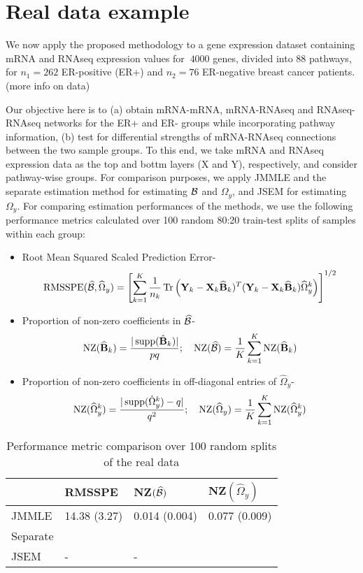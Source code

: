 \section{Real data example}
We now apply the proposed methodology to a gene expression dataset containing mRNA and RNAseq expression values for $~4000$ genes, divided into 88 pathways, for $n_1 = 262$ ER-positive (ER+) and $n_2 = 76$ ER-negative breast cancer patients. (more info on data)

Our objective here is to (a) obtain mRNA-mRNA, mRNA-RNAseq and RNAseq-RNAseq networks for the ER+ and ER- groups while incorporating pathway information, (b) test for differential strengths of mRNA-RNAseq connections between the two sample groups. To this end, we take mRNA and RNAseq expression data as the top and bottm layers (X and Y), respectively, and consider pathway-wise groups. For comparison purposes, we apply JMMLE and the separate estimation method \citet{LinEtal16} for estimating ${\cal{B}}$ and $\Omega_y$, and JSEM for estimating $\Omega_y$. For comparing estimation performances of the methods, we use the following performance metrics calculated over 100 random 80:20 train-test splits of samples within each group:
%
\begin{itemize}
\item Root Mean Squared Scaled Prediction Error-
%
$$ \text{RMSSPE}(\widehat {{\cal{B}}}, \widehat \Omega_y) = \left[
\sum_{k=1}^K \frac{1}{n_k} \operatorname*{Tr} \left({\mathbf{Y}}_k - {\mathbf{X}}_k \widehat {{\mathbf{B}}}_k)^T ({\mathbf{Y}}_k - {\mathbf{X}}_k \widehat {{\mathbf{B}}}_k)
\widehat\Omega_y^k \right)
\right]^{1/2} $$

\item Proportion of non-zero coefficients in $\widehat {{\cal{B}}}$-
%
$$ \text{NZ}(\widehat {{\mathbf{B}}}_k) = \frac{| \operatorname*{supp}(\hat {{\mathbf{B}}}_k) |}{pq}; \quad
\text{NZ}(\widehat {{\cal{B}}}) = \frac{1}{K} \sum_{k=1}^K \text{NZ}(\widehat {{\mathbf{B}}}_k) $$

\item Proportion of non-zero coefficients in off-diagonal entries of $\widehat \Omega_y$-
%
$$ \text{NZ}(\widehat \Omega_y^k) = \frac{| \operatorname*{supp}(\hat \Omega_y^k) - q|}{q^2}; \quad
\text{NZ}(\widehat \Omega_y) = \frac{1}{K} \sum_{k=1}^K \text{NZ}(\widehat \Omega_y^k) $$
\end{itemize}

\begin{table}[t]
\centering
    \begin{tabular}{llll}
    \hline
~        & RMSSPE        & NZ$(\widehat {{\cal{B}}})$  & NZ$(\widehat \Omega_y)$  \\\hline
JMMLE    & 14.38 (3.27) & 0.014 (0.004) & 0.077 (0.009) \\
Separate & ~            & ~             & ~             \\
JSEM     & -            & -             & ~             \\\hline
    \end{tabular}
    \caption{Performance metric comparison over 100 random splits of the real data}
    \label{table:real-compare}
\end{table}

